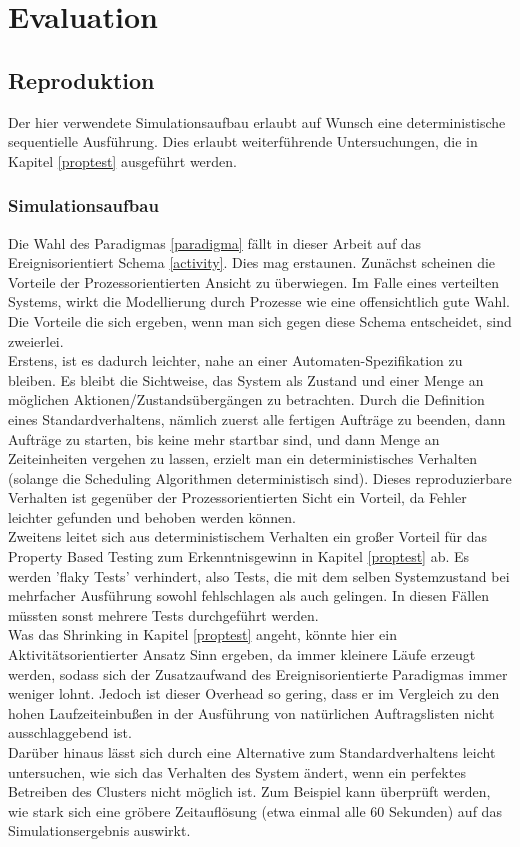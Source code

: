 \chapter{Evaluation}

\section{Reproduktion}
\label{reproduktion}

Der hier verwendete Simulationsaufbau erlaubt auf Wunsch eine deterministische sequentielle Ausführung. Dies erlaubt weiterführende Untersuchungen, die in Kapitel \ref{proptest} ausgeführt werden.

\subsection{Simulationsaufbau}
Die Wahl des Paradigmas \ref{paradigma} fällt in dieser Arbeit auf das Ereignisorientiert Schema \ref{activity}. Dies mag erstaunen. Zunächst scheinen die Vorteile der Prozessorientierten Ansicht zu überwiegen. Im Falle eines verteilten Systems, wirkt die Modellierung durch Prozesse wie eine offensichtlich gute Wahl.
Die Vorteile die sich ergeben, wenn man sich gegen diese Schema entscheidet, sind zweierlei.\\
Erstens, ist es dadurch leichter, nahe an einer Automaten-Spezifikation zu bleiben. Es bleibt die Sichtweise, das System als Zustand und einer Menge an möglichen Aktionen/Zustandsübergängen zu betrachten. Durch die Definition eines Standardverhaltens, nämlich zuerst alle fertigen Aufträge zu beenden, dann Aufträge zu starten, bis keine mehr startbar sind, und dann Menge an Zeiteinheiten vergehen zu lassen, erzielt man ein deterministisches Verhalten (solange die Scheduling Algorithmen deterministisch sind). Dieses reproduzierbare Verhalten ist gegenüber der Prozessorientierten Sicht ein Vorteil, da Fehler leichter gefunden und behoben werden können.\\
Zweitens leitet sich aus deterministischem Verhalten ein großer Vorteil für das Property Based Testing zum Erkenntnisgewinn in Kapitel \ref{proptest} ab.
Es werden 'flaky Tests' verhindert, also Tests, die mit dem selben Systemzustand bei mehrfacher Ausführung sowohl fehlschlagen als auch gelingen. In diesen Fällen müssten sonst mehrere Tests durchgeführt werden.\\
Was das Shrinking in Kapitel \ref{proptest} angeht, könnte hier ein  Aktivitätsorientierter Ansatz Sinn ergeben, da immer kleinere Läufe erzeugt werden, sodass sich der Zusatzaufwand des Ereignisorientierte Paradigmas immer weniger lohnt. Jedoch ist dieser Overhead so gering, dass er im Vergleich zu den hohen Laufzeiteinbußen in der Ausführung von natürlichen Auftragslisten nicht ausschlaggebend ist.\\
Darüber hinaus lässt sich durch eine Alternative zum Standardverhaltens leicht untersuchen, wie sich das Verhalten des System ändert, wenn ein perfektes Betreiben des Clusters nicht möglich ist. Zum Beispiel kann überprüft werden, wie stark sich eine gröbere Zeitauflösung (etwa einmal alle 60 Sekunden) auf das Simulationsergebnis auswirkt. 


